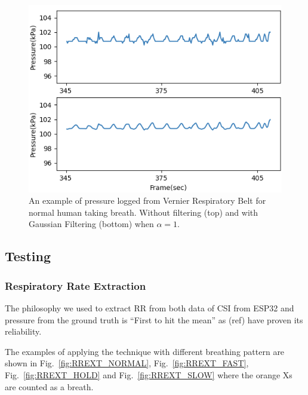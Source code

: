 \documentclass[10pt,letterpaper]{article}
\begin{document}
		
		\begin{figure}[htbp]
			\centerline{\includegraphics[width=120mm,scale=0.9]{FILGT_R2G.png}}
			\caption{An example of pressure logged from Vernier Respiratory Belt for normal human taking breath. Without filtering (top) and with Gaussian Filtering (bottom) when  $\alpha=1$.}
			\label{fig:FILGT_R2G}
		\end{figure}
		
	\subsection*{Testing}
	
	\subsubsection*{Respiratory Rate Extraction}
		
		The philosophy we used to extract RR from both data of CSI from ESP32 and pressure from the ground truth is ``First to hit the mean'' as (ref) have proven its reliability.
		
		The examples of applying the technique with different breathing pattern are shown in Fig.~\ref{fig:RREXT_NORMAL}, Fig.~\ref{fig:RREXT_FAST}, Fig.~\ref{fig:RREXT_HOLD} and  Fig.~\ref{fig:RREXT_SLOW} where the orange Xs are counted as a breath.
		
\end{document}
